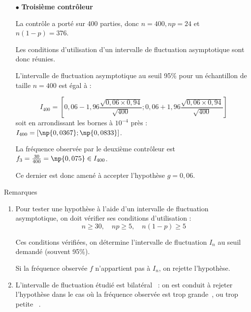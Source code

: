 \begin{spacing}{1.2}
\begin{itemize}
\item[$\bullet$] \textbf{Troisième contrôleur}

La contrôle a porté sur 400 parties, donc $n=400, np=24$ et $n(1-p)=376$.

Les conditions d'utilisation d'un intervalle de fluctuation asymptotique sont donc réunies.

L'intervalle de fluctuation asymptotique au seuil 95\% pour un échantillon de taille $n=400$ est égal à :

\[I_{400}=\left[0,06-1,96\frac{\sqrt{0,06\times 0,94}}{\sqrt{400}};0,06+1,96\frac{\sqrt{0,06\times 0,94}}{\sqrt{400}}\right]\]
soit en arrondissant les bornes à $10^{-4}$ près : $I_{400}=[\np{0,0367};\np{0,0833}]$.

La fréquence observée par le deuxième contrôleur est $f_3=\frac{30}{400}= \np{0,075}\in I_{400}$.

Ce dernier est donc amené à accepter l'hypothèse $g=0,06$.

\end{itemize}

\medskip

\begin{bclogo}[couleur = gray!30 , arrondi = 0.1 ,logo = \bclampe , barre = snake , tailleOndu = 1.5]{Remarques}

\begin{enumerate}
\item Pour tester une hypothèse à l'aide d'un intervalle de fluctuation asymptotique, on doit vérifier ses conditions d'utilisation :
\[n\geq 30, \quad np\geq 5, \quad n(1-p)\geq 5\]

Ces conditions vérifiées, on détermine l'intervalle de fluctuation $I_n$ au seuil demandé (souvent 95\%).

Si la fréquence observée $f$ n'appartient pas à $I_n$, on rejette l'hypothèse.

\item L'intervalle de fluctuation étudié est \og bilatéral\fg~ : on est conduit à rejeter l'hypothèse dans le cas où la fréquence observée est \og trop grande\fg~, ou \og trop petite \fg~.
\end{enumerate}
\end{bclogo}




\end{spacing}

